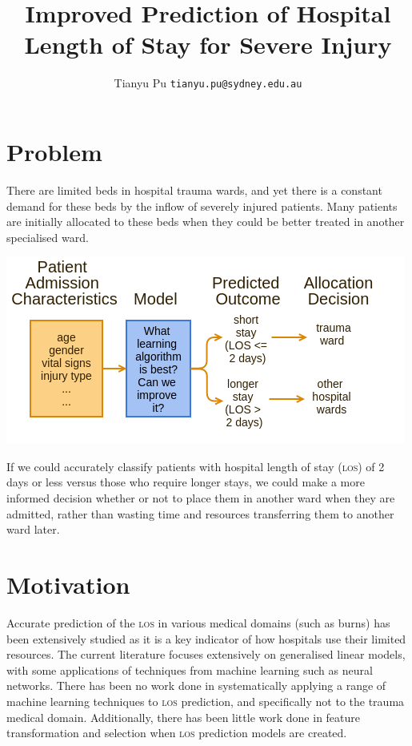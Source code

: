 \documentclass[portrait]{usydposter}
\title{Improved Prediction of Hospital Length of Stay for Severe Injury}
\author{Tianyu Pu \xspace \texttt{tianyu.pu@sydney.edu.au}}
\newcommand{\acronym}[1]{\textsc{#1}\xspace}
\newcommand{\los}{\acronym{los}}
\begin{document}
\makeheader

\begin{multicols}{3}

\section{Problem}
\noindent There are limited beds in hospital trauma wards, and yet there is a
constant demand for these beds by the inflow of severely injured patients. Many
patients are initially allocated to these beds when they could be better
treated in another specialised ward.
\begin{center}
\includegraphics[scale=0.75]{problem-diag}
\end{center}
\noindent If we could accurately classify patients with hospital length of
stay (\los) of 2 days or less versus those who require longer stays, we could
make a more informed decision whether or not to place them in another ward
when they are admitted, rather than wasting time and resources
transferring them to another ward later.

\section{Motivation}
\noindent Accurate prediction of the \los in various medical
domains (such as burns) has been extensively studied
as it is a key indicator of how hospitals use their limited resources.
The current literature focuses extensively
on generalised linear models, with some applications
of techniques from machine learning such as neural networks.
There has been no work done in systematically
applying a range of machine learning techniques to \los prediction, and
specifically not to the trauma medical domain.
Additionally, there has been little work done in feature
transformation and selection when \los prediction models are created.


\end{multicols}
\end{document}
